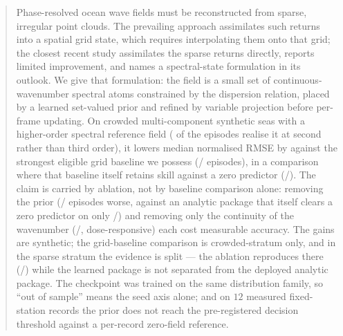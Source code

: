 \documentclass[review]{elsarticle}
\begin{document}
\begin{frontmatter}
\begin{abstract}
Phase-resolved ocean wave fields must be reconstructed from sparse, irregular point
clouds. The prevailing approach assimilates such returns into a spatial grid state,
which requires interpolating them onto that grid; the closest recent study
assimilates the sparse returns directly, reports limited improvement, and names a
spectral-state formulation in its outlook. We give that formulation: the field is a
small set of continuous-wavenumber spectral atoms constrained by the dispersion
relation, placed by a learned set-valued prior and refined by variable projection
before per-frame updating.
On crowded multi-component synthetic seas with a higher-order spectral reference
field (\HosCrowdedDegraded{} of the \HosCrowdedN{} episodes realise it at second
rather than third order), it lowers median normalised
RMSE by \BTwelveRel{} against the strongest eligible grid baseline we possess
(\BTwelveBetter{}/\BTwelveN{} episodes), in a comparison where that baseline itself
retains skill against a zero predictor (\BTwelveCmpBetter{}/\BTwelveCmpN{}). The
claim is carried by ablation, not by baseline comparison alone: removing the prior
(\BTwentyTwoBetter{}/\BTwentyTwoN{} episodes worse, against an analytic package that
itself clears a zero predictor on only \BTwentyTwoAnaZero{}/\BTwentyTwoN{}) and
removing only the continuity of the wavenumber
(\BSixteenBetter{}/\BSixteenN{}, dose-responsive) each cost measurable accuracy.
The gains are synthetic; the grid-baseline comparison is crowded-stratum only, and
in the sparse stratum the evidence is split --- the ablation reproduces there
(\BNineteenBetter{}/\BNineteenN{}) while the learned package is not separated from
the deployed analytic package. The checkpoint was trained on the same distribution
family, so ``out of sample'' means the seed axis alone; and on $12$ measured
fixed-station records the prior does not reach the pre-registered decision threshold
against a per-record zero-field reference.
\end{abstract}


\end{frontmatter}
\end{document}

